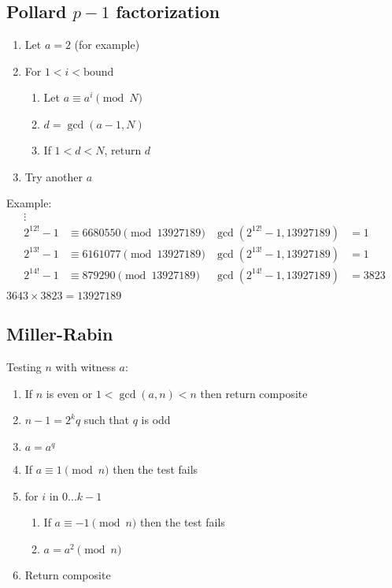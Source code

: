 \documentclass{article}
\begin{document}
\subsection*{Pollard $p-1$ factorization}
\begin{enumerate}
    \item Let $a = 2$ (for example)
    \item For $1 < i < \text{bound}$
    \begin{enumerate}
        \item Let $a \equiv a^i \pmod{N}$
        \item $d = \gcd(a - 1, N)$
        \item If $1 < d < N$, return $d$
    \end{enumerate}
    \item Try another $a$
\end{enumerate}

Example:
\begin{align*}
    \vdots \\
    2^{12!} - 1 &\equiv 6680550 \pmod{13927189} & \gcd(2^{12!} - 1, 13927189) &= 1 \\
    2^{13!} - 1 &\equiv 6161077 \pmod{13927189} & \gcd(2^{13!} - 1, 13927189) &= 1 \\
    2^{14!} - 1 &\equiv 879290  \pmod{13927189} & \gcd(2^{14!} - 1, 13927189) &= 3823 \\
\end{align*}
$3643 \times 3823 = 13927189$

\subsection*{Miller-Rabin}
Testing $n$ with witness $a$:
\begin{enumerate}
    \item If $n$ is even or $1 < \gcd(a, n) < n$ then return composite
    \item $n - 1 = 2^k q$ such that $q$ is odd
    \item $a = a^q$
    \item If $a \equiv 1 \pmod{n}$ then the test fails
    \item for $i$ in $0...k-1$
    \begin{enumerate}
        \item If $a \equiv -1 \pmod{n}$ then the test fails
        \item $a = a^2 \pmod{n}$
    \end{enumerate}
    \item Return composite
\end{enumerate}
\end{document}
